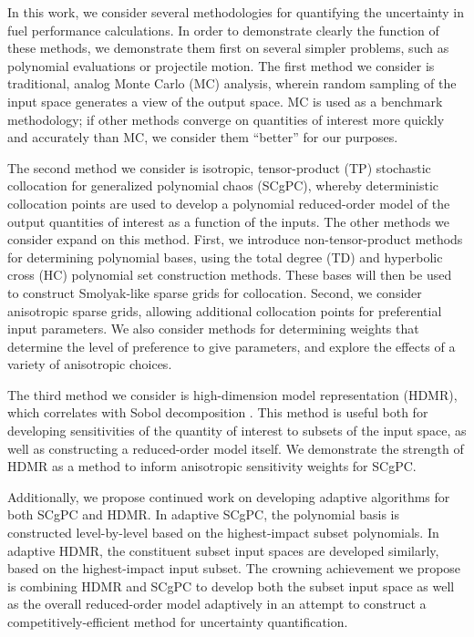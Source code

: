 In this work, we consider several methodologies for quantifying the uncertainty in fuel performance
calculations.  In order to demonstrate clearly the function of these methods, we demonstrate them first on
several simpler problems, such as polynomial evaluations or projectile motion.  The first method we consider
is traditional, analog Monte Carlo (MC) analysis, wherein random sampling of the input space generates a view of
the output space.  MC is used as a benchmark methodology; if other methods converge on quantities of interest
more quickly and accurately than MC, we consider them ``better'' for our purposes.

The second method we consider is isotropic, tensor-product (TP) stochastic collocation for generalized polynomial
chaos (SCgPC)\cite{sparseSC}\cite{sparse1}\cite{sparse2}\cite{xiu}, whereby deterministic collocation points are used to develop a polynomial reduced-order model
of the output quantities of interest as a function of the inputs.  The other methods we consider expand on
this method.  First, we introduce non-tensor-product methods for determining polynomial bases, using the 
total degree (TD) and hyperbolic cross (HC) polynomial set construction methods\cite{hctd}.
These bases will then be used to construct Smolyak-like sparse grids for collocation\cite{smolyak}.  Second, we consider
anisotropic sparse grids,
allowing additional collocation points for preferential input parameters.  We also consider methods for
determining weights that determine the level of preference to give parameters, and explore the effects of a
variety of anisotropic choices.

The third method we consider is high-dimension model representation (HDMR), which correlates with Sobol
decomposition \cite{hdmr}.  This method is useful both for developing sensitivities of the quantity of interest to subsets
of the input space, as well as constructing a reduced-order model itself.  We demonstrate the strength of HDMR
as a method to inform anisotropic sensitivity weights for SCgPC.

Additionally, we propose continued work on developing adaptive algorithms for both SCgPC and HDMR\cite{Ayres}.  In adaptive
SCgPC, the polynomial basis is constructed level-by-level based on the highest-impact subset polynomials.  In
adaptive HDMR, the constituent subset input spaces are developed similarly, based on the highest-impact input
subset.  The crowning achievement we propose is combining HDMR and SCgPC to develop both the subset input
space as well as the overall reduced-order model adaptively in an attempt to construct a
competitively-efficient method for uncertainty quantification.

